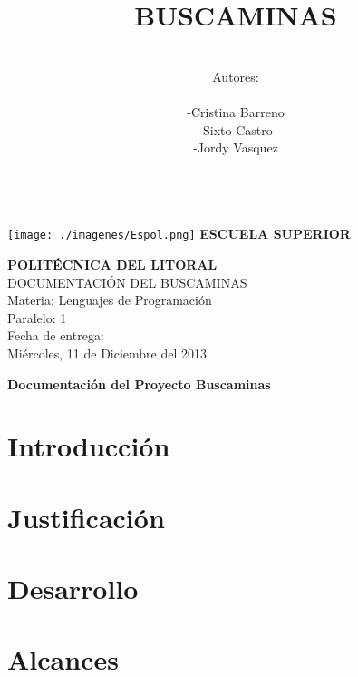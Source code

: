 \documentclass[11pt]{article} %
\title{\fontsize{30}{0} \bf BUSCAMINAS}
\author{\\Autores: \\  \\-Cristina Barreno \\ -Sixto Castro \\ -Jordy Vasquez\\ \\}
\begin{document}
\newpage

 \texttt{[image: ./imagenes/Espol.png]}{ \fontsize{18}{0} \bf ESCUELA SUPERIOR \\}
\begin{center}
{\fontsize{18}{0} \bf POLITÉCNICA DEL LITORAL\\}
\vspace{2cm}
{\LARGE{ DOCUMENTACIÓN DEL BUSCAMINAS }}\\
\vspace{2cm}
{\LARGE{ Materia: Lenguajes de Programación }}\\
\vspace{2cm}
{\LARGE{ Paralelo: 1}}\\
\vspace{2cm}
{\LARGE{Fecha de entrega: \\  Miércoles, 11 de Diciembre del 2013}}
\thispagestyle{empty}
\end{center}


\maketitle

\newpage
\tableofcontents %
\thispagestyle{empty}

\newpage
\begin{center}
 {\fontsize{16}{0} \bf Documentación del Proyecto Buscaminas}
\end{center}

\section{\fontsize{14}{0} \bf Introducción}
\section{\fontsize{14}{0} \bf Justificación}
\section{\fontsize{14}{0} \bf Desarrollo}
\section{\fontsize{14}{0} \bf Alcances}
\end{document}
